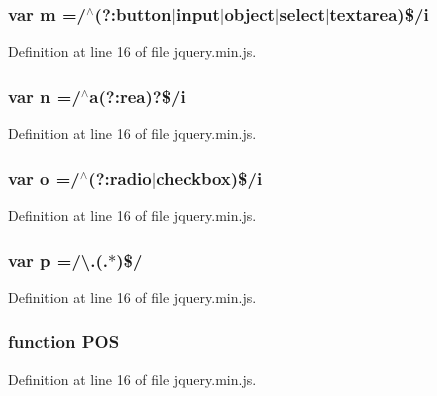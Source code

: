 \subsubsection[{m}]{\setlength{\rightskip}{0pt plus 5cm}var m =/$^\wedge$(?\-:button$|$input$|$object$|$select$|$textarea)\$/{\bf i}}\label{jquery_8min_8js_a9e77e016b2928d7dcb493b89a0c9dc32}


Definition at line 16 of file jquery.\-min.\-js.

\subsubsection[{n}]{\setlength{\rightskip}{0pt plus 5cm}var n =/$^\wedge${\bf a}(?\-:rea)?\$/{\bf i}}\label{jquery_8min_8js_a3c7365c007156a2a63223e3c9909fbf8}


Definition at line 16 of file jquery.\-min.\-js.

\subsubsection[{o}]{\setlength{\rightskip}{0pt plus 5cm}var o =/$^\wedge$(?\-:radio$|$checkbox)\$/{\bf i}}\label{jquery_8min_8js_a400dc8109620963da8314d4bdfa14f83}


Definition at line 16 of file jquery.\-min.\-js.

\subsubsection[{p}]{\setlength{\rightskip}{0pt plus 5cm}var p =/\textbackslash{}.(.$\ast$)\$/}\label{jquery_8min_8js_ad1707b001240e9c8298830073364c8bf}


Definition at line 16 of file jquery.\-min.\-js.

\subsubsection[{P\-O\-S}]{\setlength{\rightskip}{0pt plus 5cm}function P\-O\-S}\label{jquery_8min_8js_af1d5a8bb4db2644767137ee33a48036a}


Definition at line 16 of file jquery.\-min.\-js.

